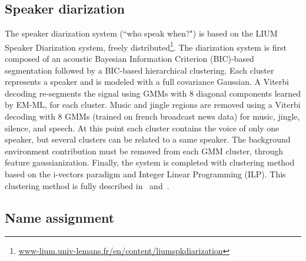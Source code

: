 \subsection{Speaker diarization}

The speaker diarization system (``who speak when?") is based on the LIUM Speaker Diarization system\cite{rouvier2013}, freely distributed\footnote{\url{www-lium.univ-lemans.fr/en/content/liumspkdiarization}}. 
%
The diarization system is first composed of an acoustic Bayesian Information Criterion (BIC)-based segmentation followed by a BIC-based hierarchical clustering. Each cluster represents a speaker and is modeled with a full covariance Gaussian. A Viterbi decoding re-segments the signal using GMMs with 8 diagonal components learned by EM-ML, for each cluster. 
Music and jingle regions are removed using a Viterbi decoding with 8 GMMs (trained on french broadcast news data) for music, jingle, silence, and speech. %
%
At this point each cluster contains the voice of only one speaker, but several clusters can be related to a same speaker. The background environment contribution must be removed from each GMM cluster, through feature gaussianization.
%
Finally, the system is completed with clustering method based on the i-vectors paradigm and Integer Linear Programming (ILP). 
This clustering method is fully described in~\cite{rouvier12-2} and~\cite{dupuy2014}. 

\subsection{Name assignment}

